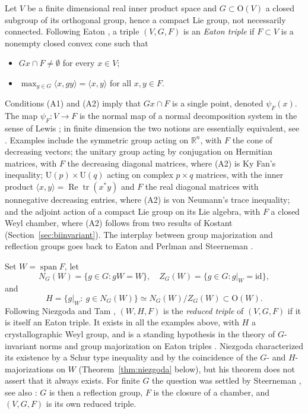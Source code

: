 \documentclass[11pt]{amsart}
\theoremstyle{plain}
\theoremstyle{definition}
\theoremstyle{remark}
\newcommand{\R}{\mathbb R}
\newcommand{\ip}[2]{\langle #1,#2\rangle}
\newcommand{\spn}{\operatorname{span}}
\begin{document}
Let $V$ be a finite dimensional real inner product space and $G\subset \mathrm{O}(V)$ a closed subgroup of its orthogonal group, hence a compact Lie group, not necessarily connected. Following Eaton \cite[Ch.~6, assumption (A.I), p.~155]{Eaton}, a triple $(V,G,F)$ is an \emph{Eaton triple} if $F\subset V$ is a nonempty closed convex cone such that
\begin{itemize}
\item[(A1)] $Gx\cap F\neq\emptyset$ for every $x\in V$;
\item[(A2)] $\max_{g\in G}\ip{x}{gy}=\ip{x}{y}$ for all $x,y\in F$.
\end{itemize}
Conditions (A1) and (A2) imply that $Gx\cap F$ is a single point, denoted $\psi_F(x)$. The map $\psi_F:V\to F$ is the normal map of a normal decomposition system in the sense of Lewis \cite{Lewis}; in finite dimension the two notions are essentially equivalent, see \cite[Remark 1.5]{DolberryTam}. Examples include the symmetric group acting on $\R^n$, with $F$ the cone of decreasing vectors; the unitary group acting by conjugation on Hermitian matrices, with $F$ the decreasing diagonal matrices, where (A2) is Ky Fan's inequality; $\mathrm{U}(p)\times \mathrm{U}(q)$ acting on complex $p\times q$ matrices, with the inner product $\ip{x}{y}=\operatorname{Re}\operatorname{tr}(x^*y)$ and $F$ the real diagonal matrices with nonnegative decreasing entries, where (A2) is von Neumann's trace inequality; and the adjoint action of a compact Lie group on its Lie algebra, with $F$ a closed Weyl chamber, where (A2) follows from two results of Kostant (Section~\ref{sec:biinvariant}). The interplay between group majorization and reflection groups goes back to Eaton and Perlman \cite{EatonPerlman} and Steerneman \cite{Steerneman}.

Set $W=\spn F$, let
\[
N_G(W)=\{g\in G: gW=W\},\quad  Z_G(W)=\{g\in G: g|_W=\mathrm{id}\},
\]
 and
\[
H=\{g|_W:\ g\in N_G(W)\}\simeq N_G(W)/Z_G(W)\subset \mathrm{O}(W).
\]
Following Niezgoda \cite{Niezgoda} and Tam \cite{Tam}, $(W,H,F)$ is the \emph{reduced triple} of $(V,G,F)$ if it is itself an Eaton triple. It exists in all the examples above, with $H$ a crystallographic Weyl group, and is a standing hypothesis in the theory of $G$-invariant norms and group majorization on Eaton triples \cite{Tam,TamHill,NiemiecTam,DolberryTam}. Niezgoda \cite[Theorem 3.2]{Niezgoda} characterized its existence by a Schur type inequality and by the coincidence of the $G$- and $H$-majorizations on $W$ (Theorem~\ref{thm:niezgoda} below), but his theorem does not assert that it always exists. For finite $G$ the question was settled by Steerneman \cite[Theorem 4.1]{Steerneman}, see also \cite[p.~817]{Lewis2000}: $G$ is then a reflection group, $F$ is the closure of a chamber, and $(V,G,F)$ is its own reduced triple.
\end{document}
